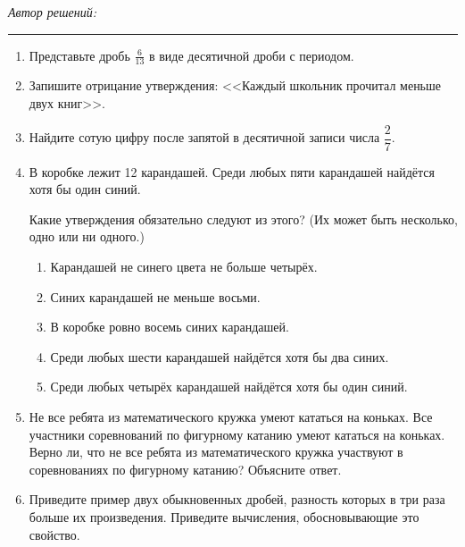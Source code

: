 \textit{Автор решений:} \rule{6cm}{0.4pt}

\begin{enumerate}[itemsep=0.8em]
    \item Представьте дробь $\frac{6}{13}$ в виде десятичной дроби с периодом.

    \item Запишите отрицание утверждения: <<Каждый школьник прочитал меньше двух книг>>.

    \vspace{1.5cm}

    \item Найдите сотую цифру после запятой в десятичной записи числа $\dfrac{2}{7}$.

    \item В коробке лежит 12 карандашей. Среди любых пяти карандашей найдётся хотя бы один синий.

    Какие утверждения обязательно следуют из этого? (Их может быть несколько, одно или ни одного.)

    \begin{enumerate}[label={},leftmargin=1.7em,itemsep=0.4em]
        \item[а)] Карандашей не синего цвета не больше четырёх.
        \item[б)] Синих карандашей не меньше восьми.
        \item[в)] В коробке ровно восемь синих карандашей.
        \item[г)] Среди любых шести карандашей найдётся хотя бы два синих.
        \item[д)] Среди любых четырёх карандашей найдётся хотя бы один синий.
    \end{enumerate}

    \newpage

    \item Не все ребята из математического кружка умеют кататься на коньках. Все участники соревнований по фигурному катанию умеют кататься на коньках. Верно ли, что не все ребята из математического кружка участвуют в соревнованиях по фигурному катанию? Объясните ответ.

    \vspace{5cm}

    \item Приведите пример двух обыкновенных дробей, разность которых в три раза больше их произведения. Приведите вычисления, обосновывающие это свойство.
\end{enumerate}
